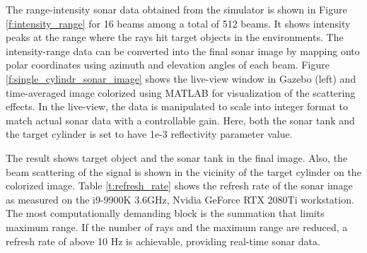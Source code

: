 \documentclass[utf8]{frontiersSCNS} %
\begin{document}
The range-intensity sonar data obtained from the simulator is shown in Figure \ref{f:intensity_range} for 16 beams among a total of 512 beams. It shows intensity peaks at the range where the rays hit target objects in the environments. The intensity-range data can be converted into the final sonar image by mapping onto polar coordinates using azimuth and elevation angles of each beam. Figure \ref{f:single_cylindr_sonar_image} shows the live-view window in Gazebo (left) and time-averaged image colorized using MATLAB for visualization of the scattering effects. In the live-view, the data is manipulated to scale into integer format to match actual sonar data with a controllable gain. Here, both the sonar tank and the target cylinder is set to have 1e-3 reflectivity parameter value.

The result shows target object and the sonar tank in the final image. Also, the beam scattering of the signal is shown in the vicinity of the target cylinder on the colorized image. Table \ref{t:refresh_rate} shows the refresh rate of the sonar image as measured on the i9-9900K 3.6GHz, Nvidia GeForce RTX 2080Ti workstation. The most computationally demanding block is the summation that limits maximum range. If the number of rays and the maximum range are reduced, a refresh rate of above 10 Hz is achievable, providing real-time sonar data.

\begin{table}[ht]
\centering
\caption{The refresh rate and calculation time of the sonar image for various sonar configurations}
\label{t:refresh_rate}
\end{table}
\end{document}
